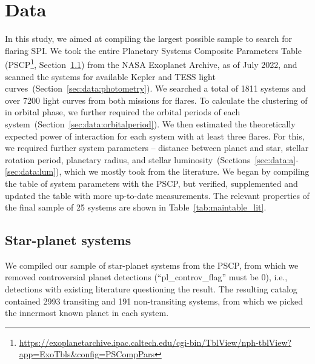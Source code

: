 \documentclass[twocolumn]{aastex631}
\begin{document}
\section{Data}
\label{sec:data}
In this study, we aimed at compiling the largest possible sample to search for flaring SPI. We took the entire Planetary Systems Composite Parameters Table (PSCP\footnote{ \url{https://exoplanetarchive.ipac.caltech.edu/cgi-bin/TblView/nph-tblView?app=ExoTbls&config=PSCompPars}}, Section~\ref{sec:data:sps}) from the NASA Exoplanet Archive, as of July 2022, and scanned the systems for available Kepler and TESS light curves~(Section~\ref{sec:data:photometry}). We searched a total of 1811 systems and over 7200 light curves from both missions for flares. To calculate the clustering of in orbital phase, we further required the orbital periods of each system~(Section~\ref{sec:data:orbitalperiod}). We then estimated the theoretically expected power of interaction for each system with at least three flares. For this, we required further system parameters -- distance between planet and star, stellar rotation period, planetary radius, and stellar luminosity~(Sections~\ref{sec:data:a}-\ref{sec:data:lum}), which we mostly took from the literature. We began by compiling the table of system parameters with the PSCP, but verified, supplemented and updated the table with more up-to-date measurements. The relevant properties of the final sample of 25 systems are shown in Table~\ref{tab:maintable_lit}.


\begin{longrotatetable}
\movetableright=-20mm
    
        \label{tab:maintable_lit}
    \tablerefs{}
\end{longrotatetable}


\subsection{Star-planet systems}
\label{sec:data:sps}
We compiled our sample of star-planet systems from the PSCP, from which we removed controversial planet detections (``pl\_controv\_flag'' must be 0), i.e., detections with existing literature questioning the result. The resulting catalog contained 2993 transiting and 191 non-transiting systems, from which we picked the innermost known planet in each system. 
\end{document}
